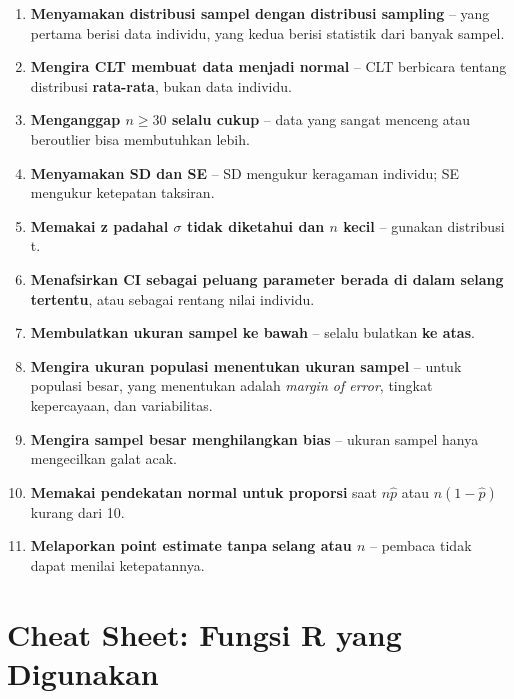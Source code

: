 \documentclass[
  indonesian,
  letterpaper,
]{book}
\providecommand{\tightlist}{%
  \setlength{\itemsep}{0pt}\setlength{\parskip}{0pt}}
\begin{document}
\begin{enumerate}
\def\labelenumi{\arabic{enumi}.}
\tightlist
\item
  \textbf{Menyamakan distribusi sampel dengan distribusi sampling} --
  yang pertama berisi data individu, yang kedua berisi statistik dari
  banyak sampel.
\item
  \textbf{Mengira CLT membuat data menjadi normal} -- CLT berbicara
  tentang distribusi \textbf{rata-rata}, bukan data individu.
\item
  \textbf{Menganggap \(n \geq 30\) selalu cukup} -- data yang sangat
  menceng atau beroutlier bisa membutuhkan lebih.
\item
  \textbf{Menyamakan SD dan SE} -- SD mengukur keragaman individu; SE
  mengukur ketepatan taksiran.
\item
  \textbf{Memakai z padahal \(\sigma\) tidak diketahui dan \(n\) kecil}
  -- gunakan distribusi t.
\item
  \textbf{Menafsirkan CI sebagai peluang parameter berada di dalam
  selang tertentu}, atau sebagai rentang nilai individu.
\item
  \textbf{Membulatkan ukuran sampel ke bawah} -- selalu bulatkan
  \textbf{ke atas}.
\item
  \textbf{Mengira ukuran populasi menentukan ukuran sampel} -- untuk
  populasi besar, yang menentukan adalah \emph{margin of error}, tingkat
  kepercayaan, dan variabilitas.
\item
  \textbf{Mengira sampel besar menghilangkan bias} -- ukuran sampel
  hanya mengecilkan galat acak.
\item
  \textbf{Memakai pendekatan normal untuk proporsi} saat \(n\hat{p}\)
  atau \(n(1-\hat{p})\) kurang dari 10.
\item
  \textbf{Melaporkan point estimate tanpa selang atau \(n\)} -- pembaca
  tidak dapat menilai ketepatannya.
\end{enumerate}

\section{Cheat Sheet: Fungsi R yang
Digunakan}\label{cheat-sheet-fungsi-r-yang-digunakan}
\end{document}
